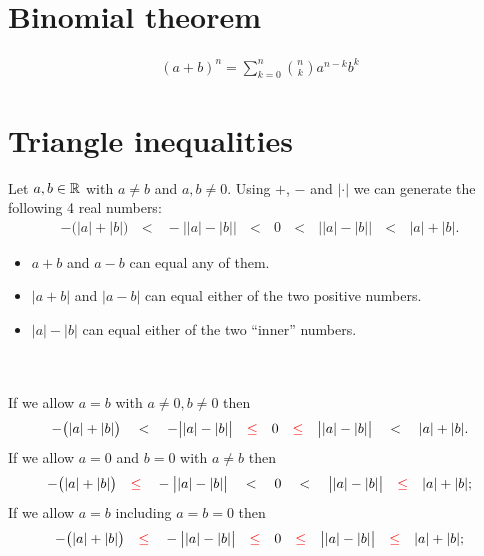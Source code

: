 \section{Binomial theorem}
\begin{align*}
  (a + b)^n = \sum_{k=0}^n{n \choose k}a^{n-k}b^k
\end{align*}

\section{Triangle inequalities}

\begin{theorem*}
  Let $a, b \in \mathbb{R}$ with $a \neq b$ and $a, b \neq 0$. Using $+$, $-$ and $|\cdot|$ we can generate the
  following 4 real numbers:
  \begin{align*}
    -\big(|a| + |b|\big) ~~~ < ~~~
    -\big||a| - |b|\big| ~~~ < ~~~
    0                    ~~~ < ~~~
    \big||a| - |b|\big|  ~~~ < ~~~
    |a| + |b|.
  \end{align*}
  \begin{itemize}
  \item $a + b$ and $a - b$ can equal any of them.
  \item $|a + b|$ and $|a - b|$ can equal either of the two positive numbers.
  \item $|a| - |b|$ can equal either of the two ``inner'' numbers.
  \end{itemize}
  ~\\~\\
  If we allow $a = b$ with $ a \neq 0, b \neq 0$ then
  \begin{align*}
    -\big(|a| + |b|\big) ~~~ < ~~~
    -\big||a| - |b|\big| ~~~ \textcolor{red}{\leq} ~~~
    0                    ~~~ \textcolor{red}{\leq} ~~~
    \big||a| - |b|\big|  ~~~ < ~~~
    |a| + |b|.
  \end{align*}
  If we allow $a = 0$ and $b = 0$ with $a \neq b$ then
  \begin{align*}
    -\big(|a| + |b|\big) ~~~ \textcolor{red}{\leq} ~~~
    -\big||a| - |b|\big| ~~~ < ~~~
    0                    ~~~ < ~~~
    \big||a| - |b|\big|  ~~~ \textcolor{red}{\leq} ~~~
    |a| + |b|;
  \end{align*}
  If we allow $a = b$ including $a = b = 0$ then
  \begin{align*}
    -\big(|a| + |b|\big) ~~~ \textcolor{red}{\leq} ~~~
    -\big||a| - |b|\big| ~~~ \textcolor{red}{\leq} ~~~
    0                    ~~~ \textcolor{red}{\leq} ~~~
    \big||a| - |b|\big|  ~~~ \textcolor{red}{\leq} ~~~
    |a| + |b|;
  \end{align*}
\end{theorem*}

